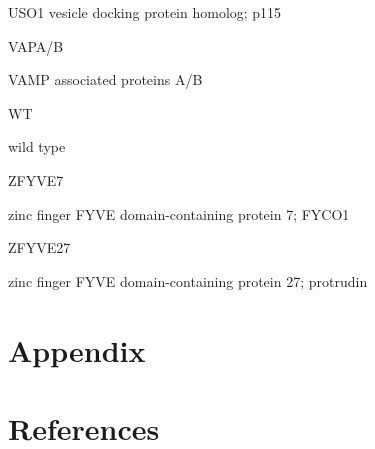 \documentclass[
  12pt,
  a4paper,
]{book}
\begin{document}
USO1 vesicle docking protein homolog; p115

VAPA/B

VAMP associated proteins A/B

WT

wild type

ZFYVE7

zinc finger FYVE domain-containing protein 7; FYCO1

ZFYVE27

zinc finger FYVE domain-containing protein 27; protrudin

\hypertarget{APPENDIX}{%
\chapter*{Appendix}\label{APPENDIX}}


\hypertarget{BIB}{%
\chapter*{References}\label{BIB}}
\end{document}
